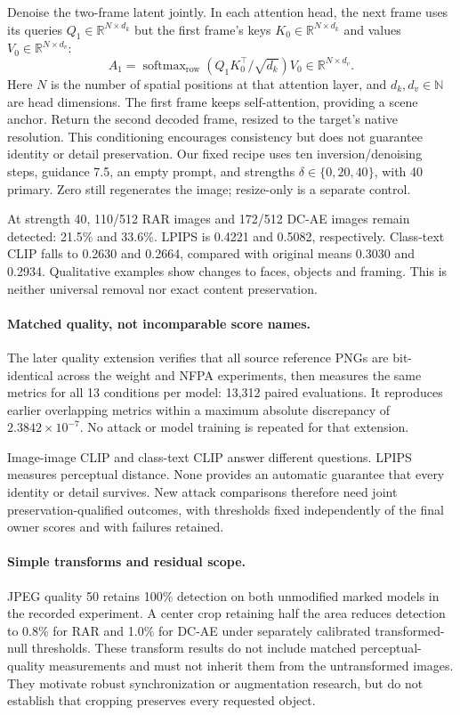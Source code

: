 Denoise the two-frame latent jointly. In each attention head, the next frame uses its queries $Q_1\in\mathbb R^{N\times d_k}$ but the first frame's keys $K_0\in\mathbb R^{N\times d_k}$ and values $V_0\in\mathbb R^{N\times d_v}$:
\[
 A_1=\operatorname{softmax}_{\mathrm{row}}(Q_1K_0^\top/\sqrt{d_k})V_0
 \in\mathbb R^{N\times d_v}.
\]
Here $N$ is the number of spatial positions at that attention layer, and $d_k,d_v\in\mathbb N$ are head dimensions. The first frame keeps self-attention, providing a scene anchor. Return the second decoded frame, resized to the target's native resolution. This conditioning encourages consistency but does not guarantee identity or detail preservation. Our fixed recipe uses ten inversion/denoising steps, guidance 7.5, an empty prompt, and strengths $\delta\in\{0,20,40\}$, with 40 primary. Zero still regenerates the image; resize-only is a separate control.

At strength 40, 110/512 RAR images and 172/512 DC-AE images remain detected: 21.5\% and 33.6\%. LPIPS is 0.4221 and 0.5082, respectively. Class-text CLIP falls to 0.2630 and 0.2664, compared with original means 0.3030 and 0.2934. Qualitative examples show changes to faces, objects and framing. This is neither universal removal nor exact content preservation.

\paragraph{Matched quality, not incomparable score names.} The later quality extension verifies that all source reference PNGs are bit-identical across the weight and NFPA experiments, then measures the same metrics for all 13 conditions per model: 13,312 paired evaluations. It reproduces earlier overlapping metrics within a maximum absolute discrepancy of $2.3842\times10^{-7}$. No attack or model training is repeated for that extension.

Image-image CLIP and class-text CLIP answer different questions. LPIPS measures perceptual distance. None provides an automatic guarantee that every identity or detail survives. New attack comparisons therefore need joint preservation-qualified outcomes, with thresholds fixed independently of the final owner scores and with failures retained.

\paragraph{Simple transforms and residual scope.} JPEG quality 50 retains 100\% detection on both unmodified marked models in the recorded experiment. A center crop retaining half the area reduces detection to 0.8\% for RAR and 1.0\% for DC-AE under separately calibrated transformed-null thresholds. These transform results do not include matched perceptual-quality measurements and must not inherit them from the untransformed images. They motivate robust synchronization or augmentation research, but do not establish that cropping preserves every requested object.

